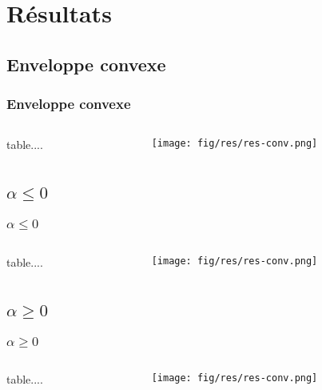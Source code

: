 \documentclass{beamer}
\begin{document}
\section{Résultats}

\subsection{Enveloppe convexe}
\begin{frame}
\frametitle{Enveloppe convexe}
  \begin{columns}[t]
    \begin{column}{3cm}
      table....
      
 
    \end{column}
    \begin{column}{7cm}
      \begin{figure}[h!]
          \centering
          \texttt{[image: fig/res/res-conv.png]}
        \end{figure}
    \end{column}
  \end{columns} 
\end{frame}

\subsection{$\alpha \leq 0$}
\begin{frame}
\frametitle{$\alpha \leq 0$}
  \begin{columns}[t]
    \begin{column}{3cm}
      table....
      
 
    \end{column}
    \begin{column}{7cm}
      \begin{figure}[h!]
          \centering
          \texttt{[image: fig/res/res-conv.png]}
        \end{figure}
    \end{column}
  \end{columns} 
\end{frame}

\subsection{$\alpha \geq 0$}
\begin{frame}
\frametitle{$\alpha \geq 0$}
  \begin{columns}[t]
    \begin{column}{3cm}
      table....
      
 
    \end{column}
    \begin{column}{7cm}
      \begin{figure}[h!]
          \centering
          \texttt{[image: fig/res/res-conv.png]}
        \end{figure}
    \end{column}
  \end{columns} 
\end{frame}
\end{document}

